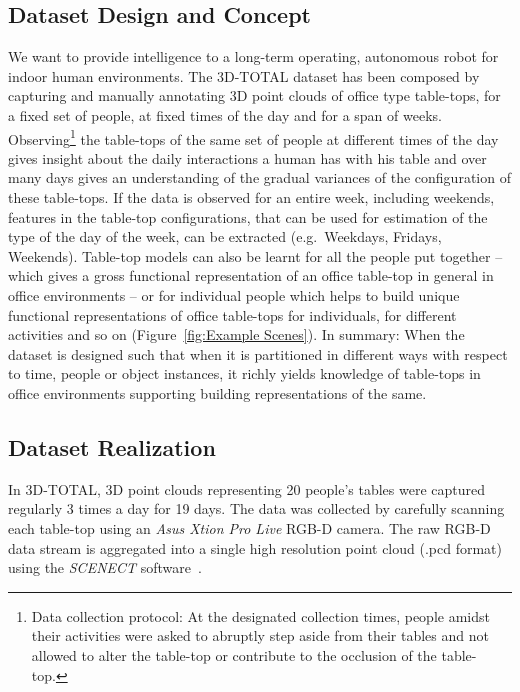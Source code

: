 \documentclass[letterpaper, 10 pt, conference]{ieeeconf}
\begin{document}
\subsection{Dataset Design and Concept}
\label{ssec:Dataset Design and Concept}
We want to provide intelligence to a long-term operating, autonomous 
robot for indoor human environments. The 3D-TOTAL dataset has 
been composed by capturing and manually annotating 3D point clouds 
of office type table-tops, for a fixed set of people, at fixed times of the 
day and for a span of weeks. Observing\footnote{Data collection protocol: At the 
designated collection times, people amidst their activities were asked to abruptly step 
aside from their tables and not allowed to alter the table-top or contribute to the 
occlusion of the table-top.} the table-tops of the same set of people at 
different times of the day gives insight about the daily interactions a 
human has with his table and over many days gives an understanding of the gradual 
variances of the configuration of these table-tops. If the data is observed for an entire week, 
including weekends, features in the table-top configurations, 
that can be used for estimation of the type of the day of the week, 
can be extracted (e.g.\ Weekdays, Fridays, Weekends). Table-top models can 
also be learnt for all the people put together -- which gives a gross functional
representation of an office table-top in general in office environments -- 
or for individual people which helps to build unique functional representations of 
office table-tops for individuals, for different activities and so on 
(Figure~\ref{fig:Example Scenes}). 
In summary: When the dataset is designed such that when it is partitioned in different ways with respect to time, people or object instances, it richly yields knowledge 
of table-tops in office environments supporting building representations of the same.

\subsection{Dataset Realization}
\label{ssec:Dataset Realization}
In 3D-TOTAL, 3D point clouds representing 20 people's tables were captured regularly 3 times a day for 19 days. The data was collected by 
carefully scanning each table-top using an \textit{Asus Xtion Pro Live} RGB-D camera. The raw RGB-D data stream is aggregated into a single 
high resolution point cloud (.pcd format) using the \textit{SCENECT} software~\cite{Buerkler:Online2012}.
\end{document}
